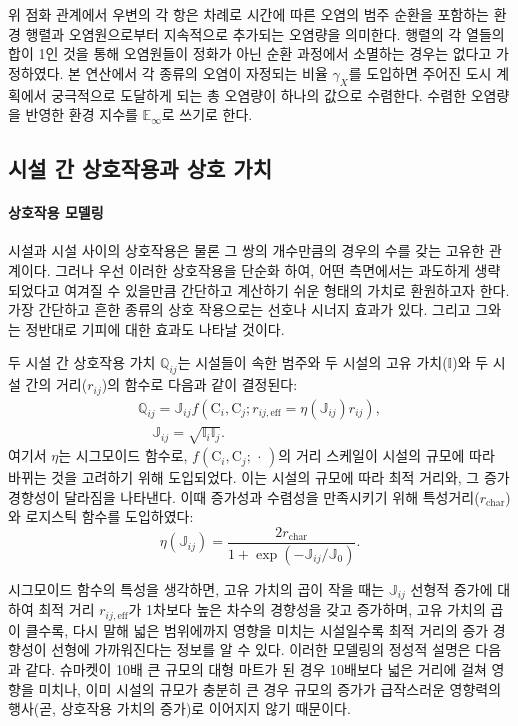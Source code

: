 \documentclass[10pt]{article}
\begin{document}
\begin{multicols}{2}
위 점화 관계에서 우변의 각 항은 차례로 시간에 따른 오염의 범주 순환을 포함하는 환경 행렬과 오염원으로부터 지속적으로 추가되는 오염량을 의미한다. 행렬의 각 열들의 합이 1인 것을 통해 오염원들이 정화가 아닌 순환 과정에서 소멸하는 경우는 없다고 가정하였다. 본 연산에서 각 종류의 오염이 자정되는 비율 $\gamma_X$를 도입하면 주어진 도시 계획에서 궁극적으로 도달하게 되는 총 오염량이 하나의 값으로 수렴한다. 수렴한 오염량을 반영한 환경 지수를 $\mathbb{E}_\infty$로 쓰기로 한다. 
 
 \subsection{시설 간 상호작용과 상호 가치}
 \paragraph{상호작용 모델링}
시설과 시설 사이의 상호작용은 물론 그 쌍의 개수만큼의 경우의 수를 갖는 고유한 관계이다. 그러나 우선 이러한 상호작용을 단순화 하여, 어떤 측면에서는 과도하게 생략되었다고 여겨질 수 있을만큼 간단하고 계산하기 쉬운 형태의 가치로 환원하고자 한다. 가장 간단하고 흔한 종류의 상호 작용으로는 선호나 시너지 효과가 있다. 그리고 그와는 정반대로 기피에 대한 효과도 나타날 것이다.

두 시설 간 상호작용 가치 $\mathbb{Q}_{ij}$는 시설들이 속한 범주와 두 시설의 고유 가치($\mathbb{I}$)와 두 시설 간의 거리($r_{ij}$)의 함수로 다음과 같이 결정된다:
\begin{multline}
 \mathbb{Q}_{ij} = \mathbb{J}_{ij} f\left( \text{C}_i, \text{C}_j; r_{ij, \text{eff}} = \eta ( \mathbb{J}_{ij} ) r_{ij} \right),\\ \quad \mathbb{J}_{ij} = \sqrt{\mathbb{I}_i \mathbb{I}_j}.
\end{multline}
여기서 $\eta$는 시그모이드 함수로, $f(\text{C}_i, \text{C}_j;\,\cdot\,)$의 거리 스케일이 시설의 규모에 따라 바뀌는 것을 고려하기 위해 도입되었다. 이는 시설의 규모에 따라 최적 거리와, 그 증가 경향성이 달라짐을 나타낸다. 이때 증가성과 수렴성을 만족시키기 위해 특성거리($r_\text{char}$)와 로지스틱 함수를 도입하였다:
\begin{equation}
 \eta(\mathbb{J}_{ij})=\frac{2r_\text{char}}{1+\exp({-\mathbb{J}_{ij} / \mathbb{J}_0})}.
\end{equation}

시그모이드 함수의 특성을 생각하면, 고유 가치의 곱이 작을 때는 $\mathbb{J}_{ij}$ 선형적 증가에 대하여 최적 거리 $r_{ij, \text{eff}}$가 1차보다 높은 차수의 경향성을 갖고 증가하며, 고유 가치의 곱이 클수록, 다시 말해 넓은 범위에까지 영향을 미치는 시설일수록 최적 거리의 증가 경향성이 선형에 가까워진다는 정보를 알 수 있다. 이러한 모델링의 정성적 설명은 다음과 같다. 슈마켓이 10배 큰 규모의 대형 마트가 된 경우 10배보다 넓은 거리에 걸쳐 영향을 미치나, 이미 시설의 규모가 충분히 큰 경우 규모의 증가가 급작스러운 영향력의 행사(곧, 상호작용 가치의 증가)로 이어지지 않기 때문이다.


\end{multicols}
\end{document}
